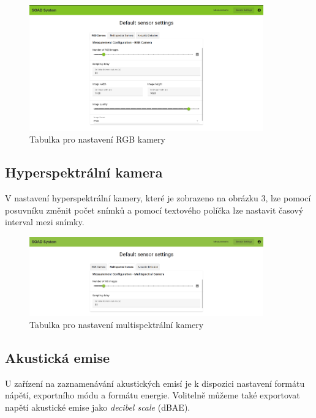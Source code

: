 \documentclass[12pt]{article}
\begin{document}
\begin{teamwork}
        \begin{figure}[hbt!]
            \centering
            \includegraphics[width=0.9\textwidth]{../../img/rgb_cam_settings}
            \caption{Tabulka pro nastavení RGB kamery}
            \label{fig:rgb_cam_settings}
        \end{figure}

        \subsection{Hyperspektrální kamera}\label{subsec:hyperspektralni-kamera}

        V nastavení hyperspektrální kamery, které je zobrazeno na obrázku 3,
        lze pomocí posuvníku změnit počet snímků a pomocí textového políčka lze nastavit časový interval mezi snímky.

        \begin{figure}[hbt!]
            \centering
            \includegraphics[width=0.9\textwidth]{../../img/multi_cam_settings}
            \caption{Tabulka pro nastavení multispektrální kamery}
            \label{fig:multi_cam_settings}
        \end{figure}

        \subsection{Akustická emise}\label{subsec:akusticka-emise}

        U zařízení na zaznamenávání akustických emisí je k dispozici nastavení formátu nápětí, exportního módu a formátu energie.
        Volitelně můžeme také exportovat napětí akustické emise jako \textit{decibel scale} (dBAE).


\end{teamwork}
\end{document}
